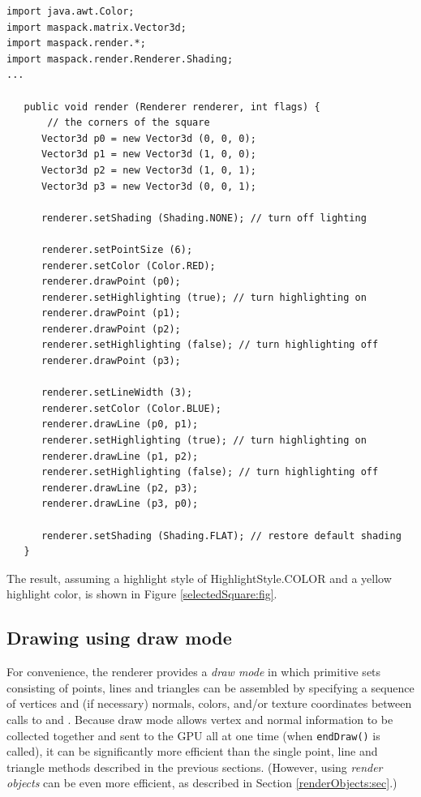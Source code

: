 \begin{lstlisting}[]
import java.awt.Color;
import maspack.matrix.Vector3d;
import maspack.render.*;
import maspack.render.Renderer.Shading;
...
   
   public void render (Renderer renderer, int flags) {
       // the corners of the square
      Vector3d p0 = new Vector3d (0, 0, 0);
      Vector3d p1 = new Vector3d (1, 0, 0);
      Vector3d p2 = new Vector3d (1, 0, 1);
      Vector3d p3 = new Vector3d (0, 0, 1);
      
      renderer.setShading (Shading.NONE); // turn off lighting
   
      renderer.setPointSize (6);
      renderer.setColor (Color.RED);
      renderer.drawPoint (p0);
      renderer.setHighlighting (true); // turn highlighting on
      renderer.drawPoint (p1);
      renderer.drawPoint (p2);
      renderer.setHighlighting (false); // turn highlighting off
      renderer.drawPoint (p3);
   
      renderer.setLineWidth (3);
      renderer.setColor (Color.BLUE);
      renderer.drawLine (p0, p1);
      renderer.setHighlighting (true); // turn highlighting on
      renderer.drawLine (p1, p2);
      renderer.setHighlighting (false); // turn highlighting off
      renderer.drawLine (p2, p3);        
      renderer.drawLine (p3, p0);        
   
      renderer.setShading (Shading.FLAT); // restore default shading
   }
\end{lstlisting}
%
The result, assuming a highlight style of
%
{HighlightStyle.COLOR} and a yellow
highlight color, is shown in Figure \ref{selectedSquare:fig}.

\subsection{Drawing using draw mode}
\label{drawMode:sec}

For convenience, the renderer provides a {\it draw mode} in which
primitive sets consisting of points, lines and triangles can be assembled
by specifying a sequence of vertices and (if necessary) normals,
colors, and/or texture coordinates between calls to
and . Because draw mode
allows vertex and normal information to be collected together and sent
to the GPU all at one time (when {\tt endDraw()} is called), it can be
significantly more efficient than the single point, line and triangle
methods described in the previous sections. (However, using {\it
render objects} can be even more efficient, as described in Section
\ref{renderObjects:sec}.)

